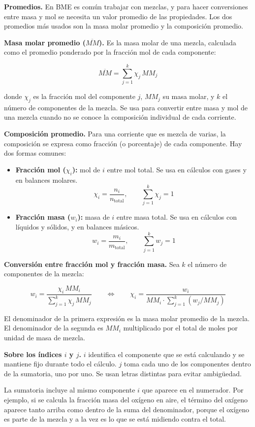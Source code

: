 \textbf{Promedios.} En BME es común trabajar con mezclas, y para hacer
conversiones entre masa y mol se necesita un valor promedio de las
propiedades. Los dos promedios más usados son la masa molar promedio
y la composición promedio.

\textbf{Masa molar promedio ($\overline{MM}$).} Es la masa molar de
una mezcla, calculada como el promedio ponderado por la fracción mol
de cada componente:

\[
\overline{MM} = \sum_{j=1}^{k} \chi_j \, MM_j
\]

donde $\chi_j$ es la fracción mol del componente $j$, $MM_j$ su masa
molar, y $k$ el número de componentes de la mezcla. Se usa para
convertir entre masa y mol de una mezcla cuando no se conoce la
composición individual de cada corriente.

\textbf{Composición promedio.} Para una corriente que es mezcla de
varias, la composición se expresa como fracción (o porcentaje) de cada
componente. Hay dos formas comunes:

\begin{itemize}
    \item \textbf{Fracción mol ($\chi_i$):} mol de $i$ entre mol total.
    Se usa en cálculos con gases y en balances molares.
    \[
    \chi_i = \frac{n_i}{n_{\text{total}}}, \qquad \sum_{j=1}^{k} \chi_j = 1
    \]
    \item \textbf{Fracción masa ($w_i$):} masa de $i$ entre masa
    total. Se usa en cálculos con líquidos y sólidos, y en balances
    másicos.
    \[
    w_i = \frac{m_i}{m_{\text{total}}}, \qquad \sum_{j=1}^{k} w_j = 1
    \]
\end{itemize}

\textbf{Conversión entre fracción mol y fracción masa.} Sea $k$ el
número de componentes de la mezcla:

\[
w_i = \frac{\chi_i \, MM_i}{\displaystyle\sum_{j=1}^{k} \chi_j \, MM_j}
\qquad \Longleftrightarrow \qquad
\chi_i = \frac{w_i}{MM_i \cdot \displaystyle\sum_{j=1}^{k} \left( w_j / MM_j \right)}
\]

El denominador de la primera expresión es la masa molar promedio de
la mezcla. El denominador de la segunda es $MM_i$ multiplicado por el
total de moles por unidad de masa de mezcla.

\begin{notafija}
\textbf{Sobre los índices $i$ y $j$.} $i$ identifica el componente
que se está calculando y se mantiene fijo durante todo el cálculo.
$j$ toma cada uno de los componentes dentro de la sumatoria, uno por
uno. Se usan letras distintas para evitar ambigüedad.

La sumatoria incluye al mismo componente $i$ que aparece en el
numerador. Por ejemplo, si se calcula la fracción masa del oxígeno en
aire, el término del oxígeno aparece tanto arriba como dentro de la
suma del denominador, porque el oxígeno es parte de la mezcla y a la
vez es lo que se está midiendo contra el total.
\end{notafija}

